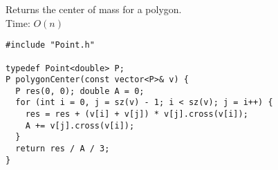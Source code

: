 Returns the center of mass for a polygon.\\
Time: $O(n)$
\begin{verbatim}
#include "Point.h"

typedef Point<double> P;
P polygonCenter(const vector<P>& v) {
  P res(0, 0); double A = 0;
  for (int i = 0, j = sz(v) - 1; i < sz(v); j = i++) {
    res = res + (v[i] + v[j]) * v[j].cross(v[i]);
    A += v[j].cross(v[i]);
  }
  return res / A / 3;
}
\end{verbatim}
